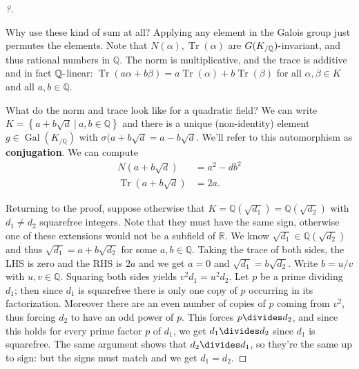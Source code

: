 \begin{proof}[?]
\begin{definition}
\end{definition}

\begin{remark}

Why use these kind of sum at all? Applying any element in the Galois
group just permutes the elements. Note that
\(N( \alpha), \operatorname{Tr}( \alpha)\) are
\(G(K_{/{\mathbb{Q}}}){\hbox{-}}\)invariant, and thus rational numbers
in \({\mathbb{Q}}\). The norm is multiplicative, and the trace is
additive and in fact \({\mathbb{Q}}{\hbox{-}}\)linear:
\(\operatorname{Tr}(a \alpha + b \beta) = a \operatorname{Tr}( \alpha) + b \operatorname{Tr}( \beta)\)
for all \(\alpha, \beta\in K\) and all \(a,b \in {\mathbb{Q}}\).

\end{remark}

What do the norm and trace look like for a quadratic field? We can write
\(K = \left\{{a + b \sqrt d {~\mathrel{\Big|}~}a,b \in {\mathbb{Q}}}\right\}\)
and there is a unique (non-identity) element
\(g\in \operatorname{Gal}(K_{/{\mathbb{Q}}})\) with
\(\sigma(a + b \sqrt d = a - b \sqrt{d}\). We'll refer to this
automorphism as \textbf{conjugation}. We can compute
\begin{align*}
N(a + b \sqrt{d} ) &= a^2 - db^2 \\
\operatorname{Tr}(a + b \sqrt{d} ) &= 2a
.\end{align*}

Returning to the proof, suppose otherwise that
\(K = {\mathbb{Q}}(\sqrt{d_1} ) = {\mathbb{Q}}( \sqrt{d_2} )\) with
\(d_1\neq d_2\) squarefree integers. Note that they must have the same
sign, otherwise one of these extensions would not be a subfield of
\({\mathbb{R}}\). We know \(\sqrt{d_1} \in {\mathbb{Q}}( \sqrt{d_2} )\)
and thus \(\sqrt{d_1} = a + b \sqrt{d_2}\) for some
\(a, b\in {\mathbb{Q}}\). Taking the trace of both sides, the LHS is
zero and the RHS is \(2a\) and we get \(a=0\) and
\(\sqrt{d_1} = b \sqrt{d_2}\). Write \(b = u/v\) with
\(u,v\in {\mathbb{Q}}\). Squaring both sides yields
\(v^2 d_1 = u^2 d_2\). Let \(p\) be a prime dividing \(d_1\); then since
\(d_1\) is squarefree there is only one copy of \(p\) occurring in its
factorization. Moreover there are an even number of copies of \(p\)
coming from \(v^2\), thus forcing \(d_2\) to have an odd power of \(p\).
This forces \(p\divides d_2\), and since this holds for every prime
factor \(p\) of \(d_1\), we get \(d_1 \divides d_2\) since \(d_1\) is
squarefree. The same argument shows that \(d_2 \divides d_1\), so
they're the same up to sign: but the signs must match and we get
\(d_1 = d_2\).

\end{proof}

